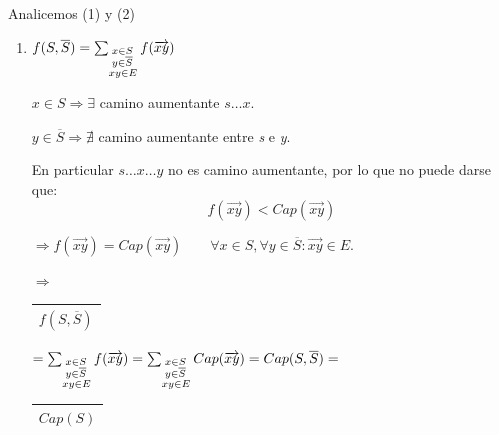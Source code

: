 \documentclass[12pt,a4paper]{report}
\begin{document}
  					\vspace{2mm}
  					\par Analicemos (1) y (2)
  					\begin{enumerate}[(1)]
  						\item $f(S, \overline{S}) = \sum_{\begin{subarray}{l} \; x \in S \\
  							\; y \in \overline{S} \\ xy \in E\end{subarray}} f(\overrightarrow{xy}) $
  							\par $x \in S \Rightarrow \exists$ camino aumentante $ s \dotsc x$.
  							\par $y \in \overline{S} \Rightarrow \nexists$ camino aumentante entre \textit{s} e \textit{y}.
  							\par En particular $s \dotsc x \dotsc y$ no es camino aumentante, por lo que no puede darse que:
  							\[
  								f(\overrightarrow{xy}) < Cap(\overrightarrow{xy})
  							\]

  							\vspace{3mm}
  							\par $\Rightarrow f(\overrightarrow{xy}) = Cap(\overrightarrow{xy}) \qquad \forall x \in S, \forall y \in \overline{S} : \overrightarrow{xy} \in E.$

  							\vspace{3mm}
  							\par $\Rightarrow$ \begin{tabular}{|c|} \hline $f(S, \overline{S})$ \\\hline \end{tabular} $= \sum_{\begin{subarray}{l} \; x \in S\\  \; y \in \overline{S} \\ xy \in E\end{subarray}} f(\overrightarrow{xy}) = \sum_{\begin{subarray}{l} \; x \in S\\  \; y \in \overline{S} \\ xy \in E\end{subarray}} Cap(\overrightarrow{xy}) = Cap(S, \overline{S}) =$ \begin{tabular}{|c|} \hline $ Cap(S) $ \\ \hline \end{tabular}


\end{enumerate}
\end{document}
